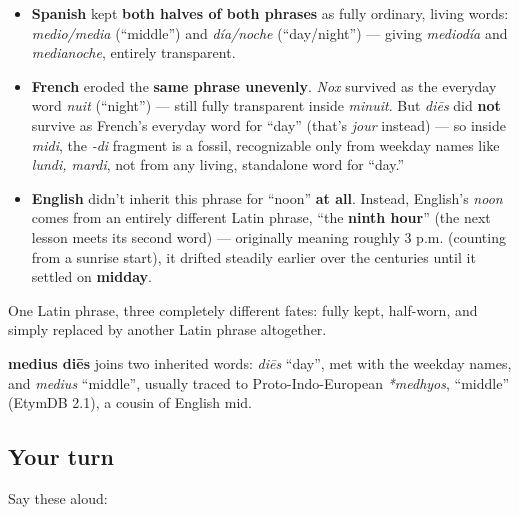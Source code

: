 \begin{culture}
\begin{itemize}
\raggedright
  \item \textbf{Spanish} kept \textbf{both halves of both phrases} as fully ordinary, living words: \emph{medio/media} (\textquotedblleft{}middle\textquotedblright{}) and \emph{día/noche} (\textquotedblleft{}day/night\textquotedblright{}) — giving \emph{mediodía} and \emph{medianoche}, entirely transparent.
  \item \textbf{French} eroded the \textbf{same phrase unevenly}. \emph{Nox} survived as the everyday word \emph{nuit} (\textquotedblleft{}night\textquotedblright{}) — still fully transparent inside \emph{minuit}. But \emph{diēs} did \textbf{not} survive as French's everyday word for \textquotedblleft{}day\textquotedblright{} (that's \emph{jour} instead) — so inside \emph{midi}, the \emph{-di} fragment is a fossil, recognizable only from weekday names like \emph{lundi, mardi}, not from any living, standalone word for \textquotedblleft{}day.\textquotedblright{}
  \item \textbf{English} didn't inherit this phrase for \textquotedblleft{}noon\textquotedblright{} \textbf{at all}. Instead, English's \emph{noon} comes from an entirely different Latin phrase, \textquotedblleft{}the \textbf{ninth hour}\textquotedblright{} (the next lesson meets its second word) — originally meaning roughly 3 p.m. (counting from a sunrise start), it drifted steadily earlier over the centuries until it settled on \textbf{midday}.
\end{itemize}

One Latin phrase, three completely different fates: fully kept, half-worn, and simply replaced by another Latin phrase altogether.
\end{culture}

\begin{cousinweb}
\textbf{medius diēs} joins two inherited words: \emph{diēs} \textquotedblleft{}day\textquotedblright{}, met with the weekday names, and \emph{medius} \textquotedblleft{}middle\textquotedblright{}, usually traced to Proto-Indo-European \emph{*medhyos}, \textquotedblleft{}middle\textquotedblright{} (EtymDB 2.1), a cousin of English mid.
\end{cousinweb}

\subsection*{Your turn}
Say these aloud:

